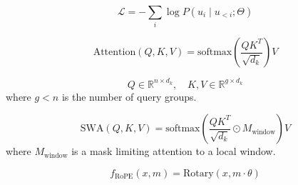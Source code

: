 
\begin{equation}
\mathcal{L} = -\sum_{i} \log P(u_i \mid u_{<i}; \Theta)
\end{equation}

\begin{equation}
\text{Attention}(Q, K, V) = \text{softmax}\left( \frac{QK^T}{\sqrt{d_k}} \right) V
\end{equation}

\begin{equation}
Q \in \mathbb{R}^{n \times d_k}, \quad K, V \in \mathbb{R}^{g \times d_k}
\end{equation}
where \(g < n\) is the number of query groups.

\begin{equation}
\text{SWA}(Q, K, V) = \text{softmax}\left( \frac{QK^T}{\sqrt{d_k}} \odot M_{\text{window}} \right) V
\end{equation}
where \(M_{\text{window}}\) is a mask limiting attention to a local window.

\begin{equation}
f_{\text{RoPE}}(x, m) = \text{Rotary}(x, m \cdot \theta)
\end{equation}